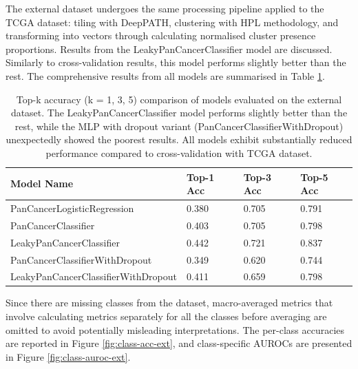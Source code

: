 \documentclass{l4proj}
\begin{document}
The external dataset undergoes the same processing pipeline applied to the TCGA dataset: tiling with DeepPATH, clustering with HPL methodology, and transforming into vectors through calculating normalised cluster presence proportions. Results from the LeakyPanCancerClassifier model are discussed. Similarly to cross-validation results, this model performs slightly better than the rest. The comprehensive results from all models are summarised in Table \ref{tab:ext-results}.

\begin{table}[h]
\centering
\caption{Top-k accuracy (k = 1, 3, 5) comparison of models evaluated on the external dataset. The LeakyPanCancerClassifier model performs slightly better than the rest, while the MLP with dropout variant (PanCancerClassifierWithDropout) unexpectedly showed the poorest results. All models exhibit substantially reduced performance compared to cross-validation with TCGA dataset.}
\label{tab:ext-results}
\begin{tabular}{@{}llll@{}}
\textbf{Model Name}                 & \textbf{Top-1 Acc} & \textbf{Top-3 Acc} & \textbf{Top-5 Acc} \\ \midrule
PanCancerLogisticRegression         & 0.380              & 0.705              & 0.791              \\
PanCancerClassifier                 & 0.403              & 0.705              & 0.798              \\
LeakyPanCancerClassifier            & 0.442              & 0.721              & 0.837              \\
PanCancerClassifierWithDropout      & 0.349              & 0.620              & 0.744              \\
LeakyPanCancerClassifierWithDropout & 0.411              & 0.659              & 0.798             
\end{tabular}
\end{table}

Since there are missing classes from the dataset, macro-averaged metrics that involve calculating metrics separately for all the classes before averaging are omitted to avoid potentially misleading interpretations. The per-class accuracies are reported in Figure \ref{fig:class-acc-ext}, and class-specific AUROCs are presented in Figure \ref{fig:class-auroc-ext}.
\end{document}

